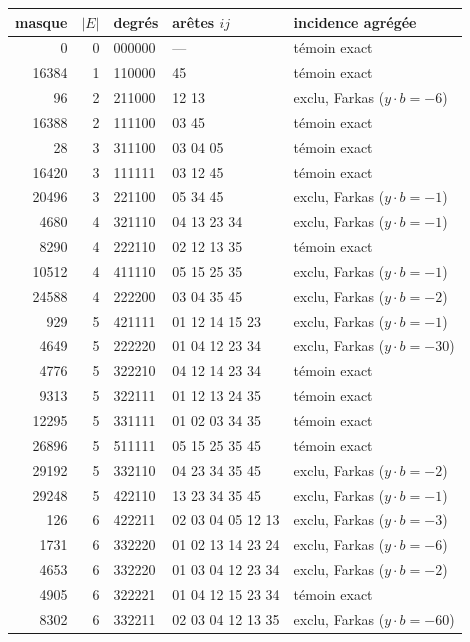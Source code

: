 \begin{longtable}{rrlll}\toprule masque & $|E|$ & degr\'es & ar\^etes $ij$ & incidence agr\'eg\'ee\\\midrule\endhead
0 & 0 & 000000 & --- & t\'emoin exact\\
16384 & 1 & 110000 & 45 & t\'emoin exact\\
96 & 2 & 211000 & 12 13 & exclu, Farkas ($y\cdot b=-6$)\\
16388 & 2 & 111100 & 03 45 & t\'emoin exact\\
28 & 3 & 311100 & 03 04 05 & t\'emoin exact\\
16420 & 3 & 111111 & 03 12 45 & t\'emoin exact\\
20496 & 3 & 221100 & 05 34 45 & exclu, Farkas ($y\cdot b=-1$)\\
4680 & 4 & 321110 & 04 13 23 34 & exclu, Farkas ($y\cdot b=-1$)\\
8290 & 4 & 222110 & 02 12 13 35 & t\'emoin exact\\
10512 & 4 & 411110 & 05 15 25 35 & exclu, Farkas ($y\cdot b=-1$)\\
24588 & 4 & 222200 & 03 04 35 45 & exclu, Farkas ($y\cdot b=-2$)\\
929 & 5 & 421111 & 01 12 14 15 23 & exclu, Farkas ($y\cdot b=-1$)\\
4649 & 5 & 222220 & 01 04 12 23 34 & exclu, Farkas ($y\cdot b=-30$)\\
4776 & 5 & 322210 & 04 12 14 23 34 & t\'emoin exact\\
9313 & 5 & 322111 & 01 12 13 24 35 & t\'emoin exact\\
12295 & 5 & 331111 & 01 02 03 34 35 & t\'emoin exact\\
26896 & 5 & 511111 & 05 15 25 35 45 & t\'emoin exact\\
29192 & 5 & 332110 & 04 23 34 35 45 & exclu, Farkas ($y\cdot b=-2$)\\
29248 & 5 & 422110 & 13 23 34 35 45 & exclu, Farkas ($y\cdot b=-1$)\\
126 & 6 & 422211 & 02 03 04 05 12 13 & exclu, Farkas ($y\cdot b=-3$)\\
1731 & 6 & 332220 & 01 02 13 14 23 24 & exclu, Farkas ($y\cdot b=-6$)\\
4653 & 6 & 332220 & 01 03 04 12 23 34 & exclu, Farkas ($y\cdot b=-2$)\\
4905 & 6 & 322221 & 01 04 12 15 23 34 & t\'emoin exact\\
8302 & 6 & 332211 & 02 03 04 12 13 35 & exclu, Farkas ($y\cdot b=-60$)\\

\end{longtable}
